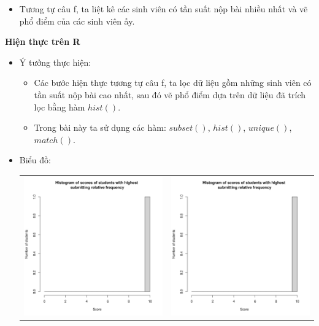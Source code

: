 \documentclass[a4paper]{article}
\theoremstyle{definition}
\begin{document}
\begin{enumerate}[a)]
\begin{itemize}
\begin{itemize}
            \item Tương tự câu f, ta liệt kê các sinh viên có tần suất nộp bài nhiều nhất và vẽ phổ điểm của các sinh viên ấy.
        \end{itemize}
    \end{itemize}
    \bf Hiện thực trên R\normalfont
    \begin{itemize}
        \item Ý tưởng thực hiện:
        \begin{itemize}
            \item Các bước hiện thực tương tự câu f, ta lọc dữ liệu gồm những sinh viên có tần suất nộp bài cao nhất, sau đó vẽ phổ điểm dựa trên dữ liệu đã trích lọc bằng hàm $hist()$.
            \item Trong bài này ta sử dụng các hàm: $subset()$, $hist()$, $unique()$, $match()$.
        \end{itemize}
        \item Biểu đồ:\\
        \begin{center}
            \begin{tabular}{c c}
                 \includegraphics[width = 6.9cm]{Images/img4-3-1.png} & \includegraphics[width = 6.9cm]{Images/img4-3-2.png} \\

\end{tabular}
\end{center}
\end{itemize}
\end{enumerate}
\end{document}
